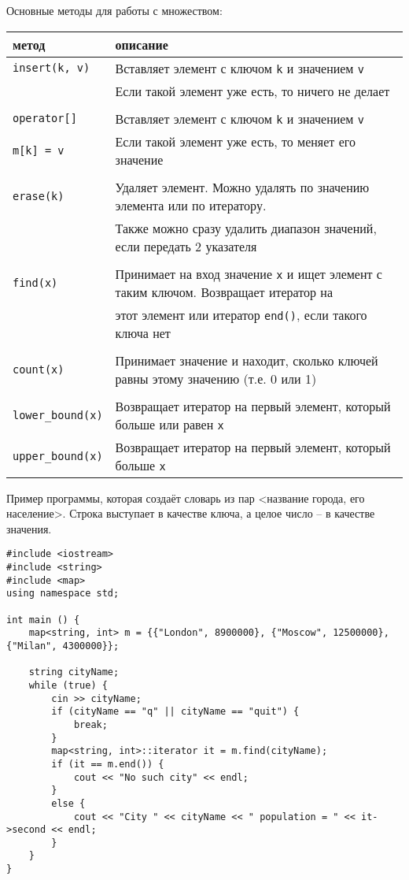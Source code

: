 \documentclass{article}
\begin{document}
Основные методы для работы с множеством:
\begin{center}
\begin{tabular}{ l | l }
 метод & описание \\ \hline
 \texttt{insert(k, v)}  & Вставляет элемент с ключом \texttt{k} и значением \texttt{v}\\
                        & Если такой элемент уже есть, то ничего не делает \\ \\\hline
 \texttt{operator[]}    &  Вставляет элемент с ключом \texttt{k} и значением \texttt{v}\\
 \texttt{m[k] = v}      & Если такой элемент уже есть, то меняет его значение \\ \\\hline
 \texttt{erase(k)}      & Удаляет элемент. Можно удалять по значению элемента или по итератору.  \\ 
                        & Также можно сразу удалить диапазон значений, если передать 2 указателя \\\\ \hline
 \texttt{find(x)}       & Принимает на вход значение \texttt{x} и ищет элемент с таким ключом. Возвращает итератор на \\
                        &  этот элемент или итератор \texttt{end()}, если такого ключа нет\\ \\ \hline
 \texttt{count(x)}      & Принимает значение и находит, сколько ключей равны этому значению (т.е. 0 или 1) \\ \\\hline
 \texttt{lower\_bound(x)}  & Возвращает итератор на первый элемент, который больше или равен \texttt{x} \\
 \texttt{upper\_bound(x)}  & Возвращает итератор на первый элемент, который больше \texttt{x} \\
\end{tabular}
\end{center}

Пример программы, которая создаёт словарь из пар <название города, его население>. Строка выступает в качестве ключа, а целое число -- в качестве значения.
\begin{lstlisting}
#include <iostream>
#include <string>
#include <map>
using namespace std;

int main () {
    map<string, int> m = {{"London", 8900000}, {"Moscow", 12500000}, {"Milan", 4300000}};

    string cityName;
    while (true) {
        cin >> cityName;
        if (cityName == "q" || cityName == "quit") {
            break;
        }
        map<string, int>::iterator it = m.find(cityName);
        if (it == m.end()) {
            cout << "No such city" << endl;
        }
        else {
            cout << "City " << cityName << " population = " << it->second << endl;
        }
    }
}
\end{lstlisting}
\end{document}
